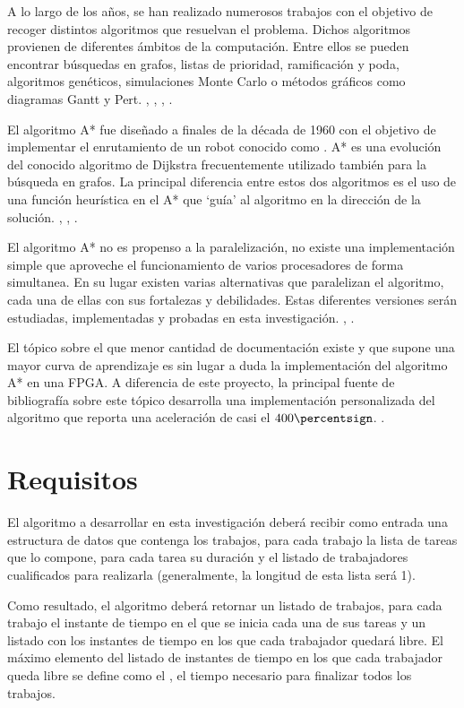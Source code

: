 A lo largo de los años, se han realizado numerosos trabajos con el objetivo
de recoger distintos algoritmos que resuelvan el problema.
Dichos algoritmos provienen de diferentes ámbitos de la computación.
Entre ellos se pueden encontrar búsquedas en grafos,
listas de prioridad, ramificación y poda, algoritmos genéticos,
simulaciones Monte Carlo o
métodos gráficos como diagramas Gantt y Pert.
\cite{Yan77}, \cite{Nil69}, \cite{KTM99}, \cite{BC22}.

El algoritmo A* fue diseñado a finales de la década de 1960
con el objetivo de implementar el enrutamiento de un robot
conocido como  \cite{Nil84}.
A* es una evolución del conocido algoritmo de Dijkstra
frecuentemente utilizado también para la búsqueda en grafos.
La principal diferencia entre estos dos algoritmos es el
uso de una función heurística en el A* que `guía' al algoritmo
en la dirección de la solución.
\cite{HNR68}, \cite{MSV13}, \cite{Kon14}.

El algoritmo A* no es propenso a la paralelización,
no existe una implementación simple que aproveche el funcionamiento de
varios procesadores de forma simultanea.
En su lugar existen varias alternativas que paralelizan el algoritmo,
cada una de ellas con sus fortalezas y debilidades.
Estas diferentes versiones serán estudiadas, implementadas y
probadas en esta investigación.
\cite{Zag17}, \cite{WH16}.

El tópico sobre el que menor cantidad de documentación existe
y que supone una mayor curva de aprendizaje es sin lugar a duda
la implementación del algoritmo A* en una FPGA.
A diferencia de este proyecto, la principal fuente de bibliografía
sobre este tópico desarrolla una implementación personalizada del algoritmo
que reporta una aceleración de casi el $400\percentsign$.
\cite{ZJW20}.

\pagebreak

\section{Requisitos}

El algoritmo a desarrollar en esta investigación deberá recibir como entrada
una estructura de datos que contenga los trabajos,
para cada trabajo la lista de tareas que lo compone,
para cada tarea su duración y el listado de trabajadores cualificados para realizarla
(generalmente, la longitud de esta lista será 1).

Como resultado, el algoritmo deberá retornar un listado de trabajos,
para cada trabajo el instante de tiempo en el que se inicia cada una de sus tareas
y un listado con los instantes de tiempo en los que cada trabajador quedará libre.
El máximo elemento del listado de instantes de tiempo en los que cada trabajador queda libre
se define como el , el tiempo necesario para finalizar todos los trabajos.

